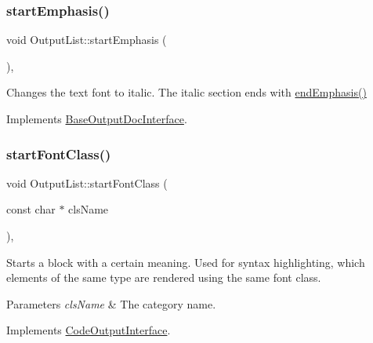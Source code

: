 \mbox{\label{class_output_list_aba5576798309803175cefaedf33b2a28}} 
\subsubsection{\texorpdfstring{startEmphasis()}{startEmphasis()}}
{\footnotesize\ttfamily void Output\+List\+::start\+Emphasis (\begin{DoxyParamCaption}{ }\end{DoxyParamCaption})\hspace{0.3cm}{\ttfamily [inline]}, {\ttfamily [virtual]}}

Changes the text font to italic. The italic section ends with \mbox{\hyperlink{class_output_list_a5674d5d9336eb1f7f6cb83c058f5ad8f}{end\+Emphasis()}} 

Implements \mbox{\hyperlink{class_base_output_doc_interface_a21debc3a6c4c58791a41e715dc78f4ab}{Base\+Output\+Doc\+Interface}}.

\mbox{\label{class_output_list_ace178947661035b39f4dc9076595c24f}} 
\subsubsection{\texorpdfstring{startFontClass()}{startFontClass()}}
{\footnotesize\ttfamily void Output\+List\+::start\+Font\+Class (\begin{DoxyParamCaption}\item[{const char $\ast$}]{cls\+Name }\end{DoxyParamCaption})\hspace{0.3cm}{\ttfamily [inline]}, {\ttfamily [virtual]}}

Starts a block with a certain meaning. Used for syntax highlighting, which elements of the same type are rendered using the same \textquotesingle{}font class\textquotesingle{}. 
\begin{DoxyParams}{Parameters}
{\em cls\+Name} & The category name. \\
\hline
\end{DoxyParams}


Implements \mbox{\hyperlink{class_code_output_interface_ac90f75968cdcf127e0b02938bdb49d87}{Code\+Output\+Interface}}.

